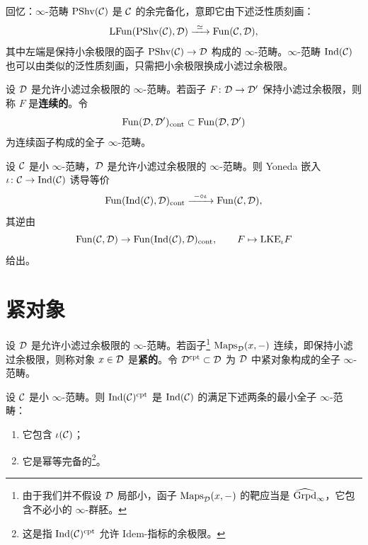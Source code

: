 \nitem\label{L13-1.9} 回忆：$\infty$-范畴 $\mathrm{PShv}(\mathcal{C})$ 是 $\mathcal{C}$ 的余完备化，意即它由下述泛性质刻画：
\[
\mathrm{LFun}(\mathrm{PShv}(\cC),\cD)\xrightarrow{\ \simeq\ }\Fun(\cC,\cD),
\]
其中左端是保持小余极限的函子 $\mathrm{PShv}(\mathcal{C})\to\mathcal{D}$ 构成的 $\infty$-范畴。$\infty$-范畴 $\operatorname{Ind}(\mathcal{C})$ 也可以由类似的泛性质刻画，只需把小余极限换成小滤过余极限。

\begin{definition}\label{L13-1.10}
设 $\mathcal{D}$ 是允许小滤过余极限的 $\infty$-范畴。若函子 $F\colon\mathcal{D}\to\mathcal{D}'$ 保持小滤过余极限，则称 $F$ 是\textbf{连续的}。令
\[
\operatorname{Fun}(\mathcal{D},\mathcal{D}')_{\mathrm{cont}}\subset\operatorname{Fun}(\mathcal{D},\mathcal{D}')
\]
为连续函子构成的全子 $\infty$-范畴。
\end{definition}


\begin{proposition}[HTT.5.3.5.10]\label{L13-1.11}
设 $\mathcal{C}$ 是小 $\infty$-范畴，$\mathcal{D}$ 是允许小滤过余极限的 $\infty$-范畴。则 Yoneda 嵌入 $\iota\colon\mathcal{C}\to\operatorname{Ind}(\mathcal{C})$ 诱导等价
\[
\Fun(\Ind(\cC),\cD)_{\mathrm{cont}}\xrightarrow{\ -\circ\iota\ }\Fun(\cC,\cD),
\]
其逆由
\[
\operatorname{Fun}(\mathcal{C},\mathcal{D})\to\operatorname{Fun}(\operatorname{Ind}(\mathcal{C}),\mathcal{D})_{\mathrm{cont}},\qquad F\mapsto\mathrm{LKE}_\iota F
\]
给出。
\end{proposition}

\section{紧对象}

\begin{definition}\label{L13-2.1}
设 $\mathcal{D}$ 是允许小滤过余极限的 $\infty$-范畴。若函子\footnote{由于我们并不假设 $\mathcal{D}$ 局部小，函子 $\mathrm{Maps}_{\mathcal{D}}(x,-)$ 的靶应当是 $\widehat{\operatorname{Grpd}}_\infty$，它包含不必小的 $\infty$-群胚。} $\mathrm{Maps}_{\mathcal{D}}(x,-)$ 连续，即保持小滤过余极限，则称对象 $x\in\mathcal{D}$ 是\textbf{紧的}。令 $\mathcal{D}^{\mathrm{cpt}}\subset\mathcal{D}$ 为 $\mathcal{D}$ 中紧对象构成的全子 $\infty$-范畴。
\end{definition}

\begin{proposition}[HTT.5.4.2.4]\label{L13-2.2}
设 $\mathcal{C}$ 是小 $\infty$-范畴。则 $\operatorname{Ind}(\mathcal{C})^{\mathrm{cpt}}$ 是 $\operatorname{Ind}(\mathcal{C})$ 的满足下述两条的最小全子 $\infty$-范畴：
\begin{enumerate}[label=(\roman*),leftmargin=2.4em,itemsep=0.1em]
\item 它包含 $\iota(\mathcal{C})$；
\item 它是幂等完备的\footnote{这是指 $\operatorname{Ind}(\mathcal{C})^{\mathrm{cpt}}$ 允许 $\mathrm{Idem}$-指标的余极限。}。
\end{enumerate}
\end{proposition}

